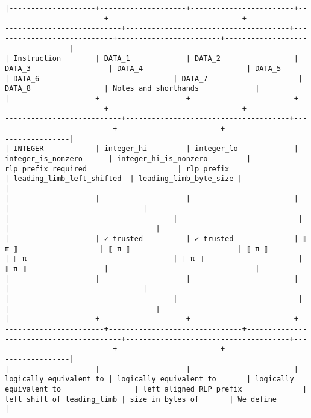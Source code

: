 \documentclass[varwidth=\maxdimen,margin=0.5cm,multi={verbatim}]{standalone}
\begin{document}
\begin{verbatim}
|--------------------+--------------------+------------------------+-------------------------+-------------------------------+-----------------------------------------+--------------------------------------+----------------------------+------------------------+----------------------------------|
| Instruction        | DATA_1             | DATA_2                 | DATA_3                  | DATA_4                        | DATA_5                                  | DATA_6                               | DATA_7                     | DATA_8                 | Notes and shorthands             |
|--------------------+--------------------+------------------------+-------------------------+-------------------------------+-----------------------------------------+--------------------------------------+----------------------------+------------------------+----------------------------------|
| INTEGER            | integer_hi         | integer_lo             | integer_is_nonzero      | integer_hi_is_nonzero         | rlp_prefix_required                     | rlp_prefix                           | leading_limb_left_shifted  | leading_limb_byte_size |                                  |
|                    |                    |                        |                         |                               |                                         |                                      |                            |                        |                                  |
|                    | ✓ trusted          | ✓ trusted              | ⟦ π ⟧                   | ⟦ π ⟧                         | ⟦ π ⟧                                   | ⟦ π ⟧                                | ⟦ π ⟧                      | ⟦ π ⟧                  |                                  |
|                    |                    |                        |                         |                               |                                         |                                      |                            |                        |                                  |
|--------------------+--------------------+------------------------+-------------------------+-------------------------------+-----------------------------------------+--------------------------------------+----------------------------+------------------------+----------------------------------|
|                    |                    |                        | logically equivalent to | logically equivalent to       | logically equivalent to                 | left aligned RLP prefix              | left shift of leading_limb | size in bytes of       | We define                        |

\end{verbatim}
\end{document}
